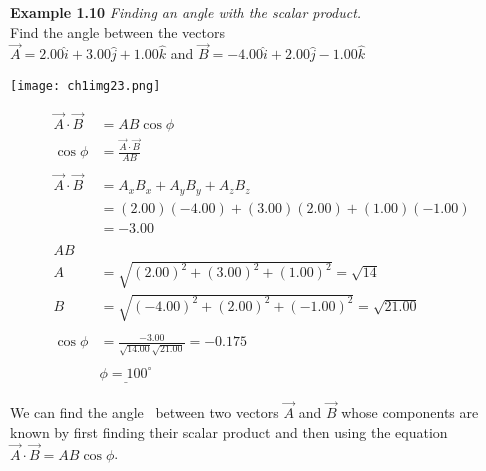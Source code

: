 \begin{examplebox}
\textbf{Example 1.10} \textit{Finding an angle with the scalar product.}\\

Find the angle between the vectors\\
$\overrightarrow{A} = 2.00\hat{i} + 3.00\hat{j} + 1.00\hat{k}$ \quad and \quad $\overrightarrow{B} = -4.00\hat{i} + 2.00\hat{j} - 1.00\hat{k}$\\
\begin{center}
\texttt{[image: ch1img23.png]}
\end{center}
\begin{mathbox}
\begin{align*}
\overrightarrow{A} \cdot \overrightarrow{B} &= A B \cos \phi\ \\
\cos \phi &= \frac{\overrightarrow{A} \cdot \overrightarrow{B}}{A B}\\\\
\overrightarrow{A} \cdot \overrightarrow{B} &= A_xB_x + A_yB_y + A_zB_z\\
&= \left(2.00\right) \left(-4.00\right) + \left(3.00\right) \left(2.00\right) + \left(1.00\right) \left(-1.00\right)\\
&= -3.00\\\\
A B\\ 
A &= \sqrt{\left(2.00\right)^2 + \left(3.00\right)^2 + \left(1.00\right)^2} = \sqrt{14}\\
B &= \sqrt{\left(-4.00\right)^2 + \left(2.00\right)^2 + \left(-1.00\right)^2} = \sqrt{21.00}\\\\
\cos \phi &= \frac{-3.00}{\sqrt{14.00} \sqrt{21.00}} = -0.175\\\\
&\underline{\phi = 100^\circ}
\end{align*}
\end{mathbox}
\end{examplebox} 
\begin{tipbox}
We can find the angle \phi\, between two vectors $\overrightarrow{A}$ and $\overrightarrow{B}$ whose components are known by first finding their scalar product and then using the equation $\overrightarrow{A} \cdot \overrightarrow{B} = AB \cos \phi$.
\end{tipbox}

